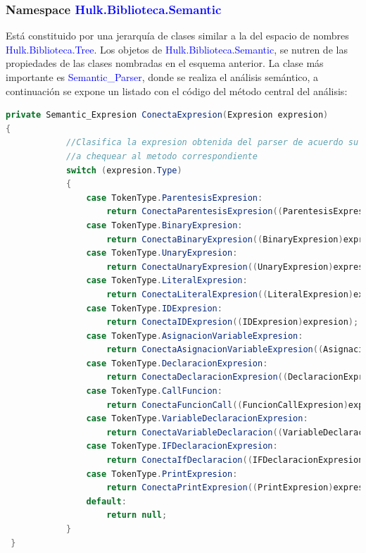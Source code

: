\documentclass[a4paper, 12pt]{article}
\begin{document}
\subsubsection{Namespace \textcolor{blue}{Hulk.Biblioteca.Semantic}}\label{}
Está constituido por una jerarquía de clases similar a la del espacio de nombres \textcolor{blue}{Hulk.Biblioteca.Tree}. Los objetos de \textcolor{blue}{Hulk.Biblioteca.Semantic}, se nutren de las propiedades de las clases nombradas en el esquema anterior. La clase más importante es \textcolor{blue}{Semantic\_Parser}, donde se realiza el análisis semántico, a continuación se expone un listado con el código del método central del análisis:
\begin{lstlisting}[language= Java]
 private Semantic_Expresion ConectaExpresion(Expresion expresion)
{
            //Clasifica la expresion obtenida del parser de acuerdo su tipo y la envia
            //a chequear al metodo correspondiente
            switch (expresion.Type)
            {
                case TokenType.ParentesisExpresion:
                    return ConectaParentesisExpresion((ParentesisExpresion)expresion);
                case TokenType.BinaryExpresion:
                    return ConectaBinaryExpresion((BinaryExpresion)expresion);
                case TokenType.UnaryExpresion:
                    return ConectaUnaryExpresion((UnaryExpresion)expresion);
                case TokenType.LiteralExpresion:
                    return ConectaLiteralExpresion((LiteralExpresion)expresion);
                case TokenType.IDExpresion:
                    return ConectaIDExpresion((IDExpresion)expresion);
                case TokenType.AsignacionVariableExpresion:
                    return ConectaAsignacionVariableExpresion((AsignacionVariableExpresion)expresion);
                case TokenType.DeclaracionExpresion:
                    return ConectaDeclaracionExpresion((DeclaracionExpresion)expresion);
                case TokenType.CallFuncion:
                    return ConectaFuncionCall((FuncionCallExpresion)expresion);
                case TokenType.VariableDeclaracionExpresion:
                    return ConectaVariableDeclaracion((VariableDeclaracionExpresion)expresion);
                case TokenType.IFDeclaracionExpresion:
                    return ConectaIfDeclaracion((IFDeclaracionExpresion)expresion);
                case TokenType.PrintExpresion:
                    return ConectaPrintExpresion((PrintExpresion)expresion);
                default:
                    return null;
            }
 }
\end{lstlisting}
\end{document}
